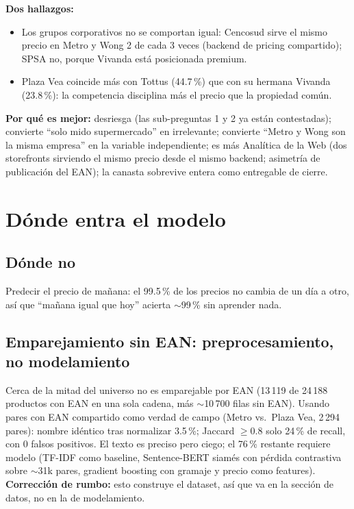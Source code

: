 \documentclass[11pt,a4paper]{article}
\begin{document}
\textbf{Dos hallazgos:}
\begin{itemize}[nosep]
  \item Los grupos corporativos no se comportan igual: Cencosud sirve el mismo
        precio en Metro y Wong 2 de cada 3 veces (backend de pricing compartido);
        SPSA no, porque Vivanda está posicionada premium.
  \item Plaza Vea coincide más con Tottus (44.7\,\%) que con su hermana Vivanda
        (23.8\,\%): la competencia disciplina más el precio que la propiedad común.
\end{itemize}

\textbf{Por qué es mejor:} desriesga (las sub-preguntas 1 y 2 ya están
contestadas); convierte ``solo mido supermercado'' en irrelevante; convierte
``Metro y Wong son la misma empresa'' en la variable independiente; es más
Analítica de la Web (dos storefronts sirviendo el mismo precio desde el mismo
backend; asimetría de publicación del EAN); la canasta sobrevive entera como
entregable de cierre.

\section{Dónde entra el modelo}

\subsection*{Dónde no}
Predecir el precio de mañana: el 99.5\,\% de los precios no cambia de un día a
otro, así que ``mañana igual que hoy'' acierta $\sim$99\,\% sin aprender nada.

\subsection*{Emparejamiento sin EAN: preprocesamiento, no modelamiento}
Cerca de la mitad del universo no es emparejable por EAN (13\,119 de 24\,188
productos con EAN en una sola cadena, más $\sim$10\,700 filas sin EAN). Usando
pares con EAN compartido como verdad de campo (Metro vs.\ Plaza Vea, 2\,294 pares):
nombre idéntico tras normalizar 3.5\,\%; Jaccard $\geq 0.8$ solo 24\,\% de
recall, con 0 falsos positivos. El texto es preciso pero ciego; el 76\,\% restante
requiere modelo (TF-IDF como baseline, Sentence-BERT siamés con pérdida
contrastiva sobre $\sim$31k pares, gradient boosting con gramaje y precio como
features). \textbf{Corrección de rumbo:} esto construye el dataset, así que va en
la sección de datos, no en la de modelamiento.
\end{document}
